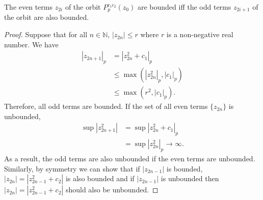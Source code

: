 \documentclass[10pt,a4paper]{amsart}
\newcommand{\N}{\mathbb{N}}
\begin{document}
\begin{theorem}
    \label{thm:p-adic boundedness}
    The even terms $z_{2i}$ of the orbit $P^{c_1c_2}_p(z_0)$ are bounded iff the odd terms $z_{2i+1}$ of the orbit are also bounded. 
\end{theorem}

\begin{proof}
    Suppose that for all $n\in\N$, $|z_{2n}|\leq r$ where $r$ is a non-negative real number. We have
    \begin{align*}
        |z_{2n+1}|_p &= |z_{2n}^2 + c_1|_p \\
                & \leq \max(|z_{2n}^2|_p, |c_1|_p) \\
                & \leq \max(r^2, |c_1|_p) \text{.}
    \end{align*}
    Therefore, all odd terms are bounded. If the set of all even terms $\{z_{2n}\}$ is unbounded,
\begin{align*}
    \sup |z_{2n+1}^2| &= \sup |z_{2n}^2 + c_1|_p \\
    &= \sup |z_{2n}^2|_p \to \infty.
\end{align*}
    As a result, the odd terms are also unbounded if the even terms are unbounded. Similarly, by symmetry we can show that if $|z_{2n-1}|$ is bounded, $|z_{2n}| =|z_{2n-1}^2 + c_2|$ is also bounded and if 
    $|z_{2n-1}|$ is unbounded then $|z_{2n}| =|z_{2n-1}^2 + c_2|$ should also be unbounded. 
\end{proof}
\end{document}
